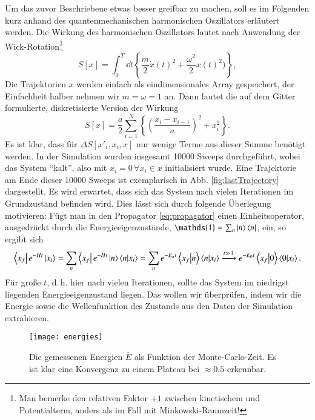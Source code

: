 Um das zuvor Beschriebene etwas besser greifbar zu machen, soll es im Folgenden
kurz anhand des quantenmechanischen harmonischen Oszillators erläutert werden. Die
Wirkung des harmonischen Oszillators lautet nach Anwendung der
Wick-Rotation\footnote{Man bemerke den relativen Faktor $+1$ zwischen kinetischem
und Potentialterm, anders als im Fall mit Minkowski-Raumzeit!}
\[
    S[x] = \int_0^T \dd{t} \left\{ \frac{m}{2} \dot{x}(t)^2
    + \frac{\omega^2}{2} x(t)^2) \right\},
\]
Die Trajektorien $x$ werden einfach als eindimensionales Array gespeichert, der
Einfachheit halber nehmen wir $m=\omega=1$ an. Dann lautet die auf dem Gitter
formulierte, diskretisierte Version der Wirkung
\[
    S[x] = \frac{a}{2} \sum_{i=1}^{N} \left\{\left( \frac{x_i - x_{i-1}}{a} \right)^2
    + x_i^2 \right\}.
\]
Es ist klar, dass für $\Delta S[x'_i, x_i, x]$ nur wenige Terme aus dieser Summe
benötigt werden. In der Simulation wurden insgesamt 10000 Sweeps durchgeführt, wobei
das System \enquote{kalt}, also mit $x_i = 0 \, \forall x_i \in x$ initialisiert wurde.
Eine Trajektorie am Ende dieser 10000 Sweeps ist exemplarisch in Abb.
\ref{fig:lastTrajectory}
dargestellt. Es wird erwartet, dass sich das System nach vielen Iterationen im
Grundzustand befinden wird. Dies lässt sich durch folgende Überlegung motivieren:
Fügt man in den Propagator \eqref{eq:propagator} einen Einheitsoperator, ausgedrückt
durch die Energieeigenzustände, $\mathds{1} = \sum_n \ket{n} \bra{n}$, ein, so
ergibt sich
\begin{equation} \label{eq:groundStateAtLargeT}
    \bra{x_f} e^{-H t} \ket{x_i}
    = \sum_n \bra{x_f} e^{-H t} \ket{n} \braket{n}{x_i}
    = \sum_n e^{-E_n t} \braket{x_f}{n} \braket{n}{x_i}
    \xrightarrow{t \gg 1} e^{-E_0 t} \braket{x_f}{0} \braket{0}{x_i}.
\end{equation}
Für große $t$, d.\,h. hier nach vielen Iterationen, sollte das System im niedrigst
liegenden Energieeigenzustand liegen. Das wollen wir überprüfen, indem wir die
Energie sowie die Wellenfunktion des Zustands aus den Daten der Simulation
extrahieren.

\begin{figure}[htbp]
    \centering
    \texttt{[image: energies]}
    \caption{Die gemessenen Energien $\overline{E}$ als Funktion der
    Monte-Carlo-Zeit. Es ist klar eine Konvergenz zu einem Plateau bei $\approx 0.5$
    erkennbar.}
    \label{fig:energies}
\end{figure}

